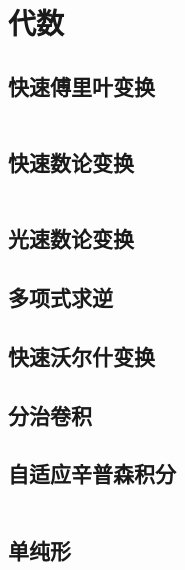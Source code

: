 \chapter{代数}
\section{快速傅里叶变换}
\inputminted{cpp}{\source/algebra/fast-fourier-transform.cpp}
\section{快速数论变换}
\inputminted{cpp}{\source/algebra/fast-numerical-transform.cpp}
\section{光速数论变换}
\section{多项式求逆}
\section{快速沃尔什变换}
\section{分治卷积}
\section{自适应辛普森积分}
\inputminted{cpp}{\source/algebra/adaptive-simpsons-method.cpp}
\section{单纯形}
\inputminted{cpp}{\source/algebra/simplex.cpp}
